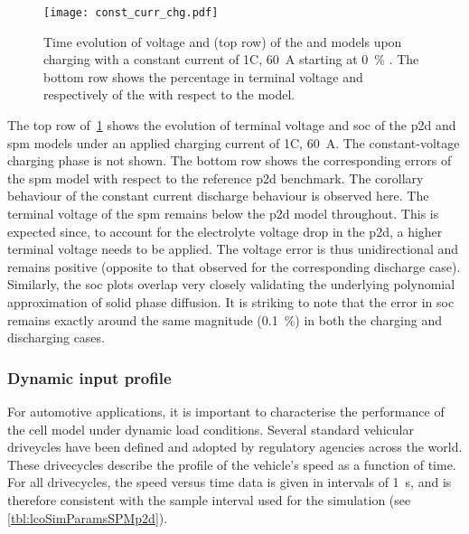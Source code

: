 \begin{figure}[!htb]
    \centering
    \texttt{[image: const\_curr\_chg.pdf]}
    \caption[Voltage and  computed by  and
     for 1C constant current charge]{Time evolution of voltage
        and  (top row) of the  and
         models upon charging with a constant current of 1C,
        \ie{} \SI{60}{\ampere} starting at \SI{0}{\percent} .
        The bottom row shows the percentage in terminal voltage and
         respectively of the  with respect to
    the  model.}
    \label{fig:cnstchgspmp2d}
\end{figure}

The top row of~\cref{fig:cnstchgspmp2d} shows  the evolution of terminal voltage
and \gls{soc}  of the \gls{p2d} and  \gls{spm} models under an  applied charging
current of  1C, \ie{} \SI{60}{\ampere}.  The constant-voltage charging  phase is
not shown. The bottom row shows  the corresponding errors of the \gls{spm} model
with respect  to the reference  \gls{p2d} benchmark. The corollary  behaviour of
the constant current discharge behaviour  is observed here. The terminal voltage
of the \gls{spm} remains below the  \gls{p2d} model throughout. This is expected
since, to  account for the electrolyte  voltage drop in the  \gls{p2d}, a higher
terminal voltage needs  to be applied. The voltage error  is thus unidirectional
and remains positive (opposite to  that observed for the corresponding discharge
case).  Similarly,  the \gls{soc}  plots  overlap  very closely  validating  the
underlying polynomial approximation of solid  phase diffusion. It is striking to
note  that the  error in  \gls{soc} remains  exactly around  the same  magnitude
(\approx\SI{0.1}{\percent}) in both the charging and discharging cases.

\subsubsection*{Dynamic input profile}\label{subsubsec:dynamicspmp2dsim}

For automotive applications, it is  important to characterise the performance of
the  cell  model  under  dynamic load  conditions.  Several  standard  vehicular
driveycles  have been  defined and  adopted  by regulatory  agencies across  the
world. These drivecycles
describe  the  profile  of the  vehicle's  speed  as  a  function of  time.  For
all  drivecycles,  the  speed  versus  time   data  is  given  in  intervals  of
\SI{1}{\second}, and is  therefore consistent with the sample  interval used for
the simulation (see \cref{tbl:lcoSimParamsSPMp2d}).

